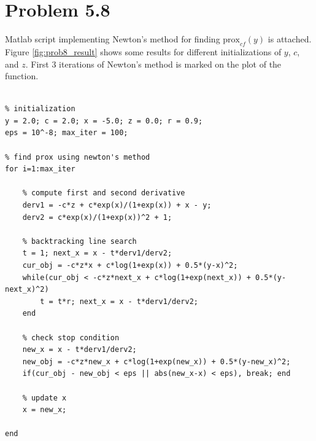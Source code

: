 \documentclass{scrartcl}
\begin{document}
\section*{Problem 5.8}

Matlab script implementing Newton's method for finding $\text{prox}_{cf}(y)$ is attached.
Figure \ref{fig:prob8_result} shows some results for different initializations of $y$, $c$, and $z$.
First 3 iterations of Newton's method is marked on the plot of the function.

\begin{verbatim}

% initialization
y = 2.0; c = 2.0; x = -5.0; z = 0.0; r = 0.9;
eps = 10^-8; max_iter = 100;

% find prox using newton's method
for i=1:max_iter
    
    % compute first and second derivative
    derv1 = -c*z + c*exp(x)/(1+exp(x)) + x - y;
    derv2 = c*exp(x)/(1+exp(x))^2 + 1;

    % backtracking line search
    t = 1; next_x = x - t*derv1/derv2;
    cur_obj = -c*z*x + c*log(1+exp(x)) + 0.5*(y-x)^2;
    while(cur_obj < -c*z*next_x + c*log(1+exp(next_x)) + 0.5*(y-next_x)^2)
        t = t*r; next_x = x - t*derv1/derv2;
    end
    
    % check stop condition
    new_x = x - t*derv1/derv2;
    new_obj = -c*z*new_x + c*log(1+exp(new_x)) + 0.5*(y-new_x)^2;
    if(cur_obj - new_obj < eps || abs(new_x-x) < eps), break; end
    
    % update x
    x = new_x;
    
end

\end{verbatim}
\end{document}

